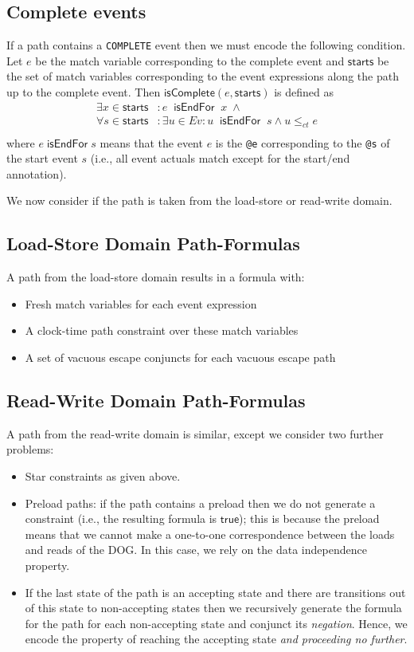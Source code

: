\documentclass[10pt]{paper}
\newcommand{\isEndFor}{\;\mathsf{isEndFor}\;}
\begin{document}
\subsection{Complete events}
%
If a path contains a \texttt{COMPLETE} event then we must encode the following condition.
%
Let $e$ be the match variable corresponding to the complete event and $\mathsf{starts}$ be the set of match variables corresponding to the event expressions along the path up to the complete event.
%
Then $\mathsf{isComplete}(e, \mathsf{starts})$ is defined as
%
\begin{align*}
\exists x \in \mathsf{starts} & : e\; \isEndFor\; x\; \wedge \\
\forall s \in \mathsf{starts} & : \exists u \in Ev : u\; \isEndFor\; s \wedge u \leq_{ct} e \\
\end{align*}
%
where $e \isEndFor s$ means that the event $e$ is the \texttt{@e} corresponding to the \texttt{@s} of the start event $s$ (i.e., all event actuals match except for the start/end annotation).

We now consider if the path is taken from the load-store or read-write domain.
%
\subsection{Load-Store Domain Path-Formulas}
%
A path from the load-store domain results in a formula with:
%
\begin{itemize}
\item Fresh match variables for each event expression
%
\item A clock-time path constraint over these match variables
%
\item A set of vacuous escape conjuncts for each vacuous escape path
\end{itemize}

\subsection{Read-Write Domain Path-Formulas}
%
A path from the read-write domain is similar, except we consider two further problems:
%
\begin{itemize}
%
\item Star constraints as given above.
%
\item Preload paths: if the path contains a preload then we do not generate a constraint (i.e., the resulting formula is $\mathsf{true}$); this is because the preload means that we cannot make a one-to-one correspondence between the loads and reads of the DOG.
%
In this case, we rely on the data independence property.
%
\item If the last state of the path is an accepting state and there are transitions out of this state to non-accepting states then we recursively generate the formula for the path for each non-accepting state and conjunct its \emph{negation}.
%
Hence, we encode the property of reaching the accepting state \emph{and proceeding no further}.
%
\end{itemize}
\end{document}
